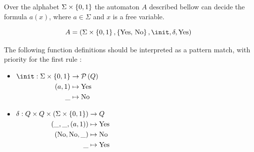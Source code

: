 \documentclass[twoside]{article}
\begin{document}
\begin{lemma}
	Over the alphabet $\Sigma \times \left\{0,1\right\}$ the automaton $A$ described bellow can decide the formula $a (x)$,
	where $a \in \Sigma$ and $x$ is a free variable.

	\[A =   (\Sigma \times \set {0,1}, \set {\text {Yes, No}} ,  \init, \delta, \text{Yes})  \]

	The following function definitions should be interpreted as a pattern match, with priority for the first rule :

	\begin{itemize}
		\item $\begin{aligned}[t]
				      \init      : \Sigma \times \set{0,1} & \to \parts Q       \\
				      (a, 1)                               & \mapsto \text{Yes} \\
				      \_                                   & \mapsto \text{No}
			      \end{aligned} $

		\item $\begin{aligned}[t]
				      \delta               : Q \times Q \times (\Sigma \times \left\{0,1\right\}) & \to Q              \\
				      (\_, \_, (a,1))                                                     & \mapsto \text{Yes} \\
				      (\text{No}, \text{No},  \_)                                         & \mapsto \text{No}  \\
				      \_                                                                  & \mapsto \text{Yes}
			      \end{aligned}$
	\end{itemize}
\end{lemma}
\end{document}
